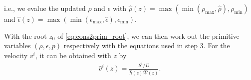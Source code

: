 \begin{Step}
    i.e., we evalue the updated $\rho$ and $\epsilon$ with 
    $\hat{\rho}(z) = \max\left(\min\left(\rho_\max{},\hat{\rho}\right),\rho_\min{}\right)$ and
    $\hat{\epsilon}(z) = \max\left(\min\left(\epsilon_\max{},\hat{\epsilon}\right),\epsilon_\min{}\right)$.
    \item With the root $z_0$ of \cref{eq:cons2prim_root},
    we can then work out the primitive variables $\left(\rho, \epsilon, p\right)$ respectively with the equations used in step 3.
    For the velocity $v^i$, it can be obtained with $z$ by
    \begin{align}
        \hat{v}^i(z) = \frac{S^i/D}{\hat{h}(z)\hat{W}(z)}.
    \end{align}
\end{Step}

